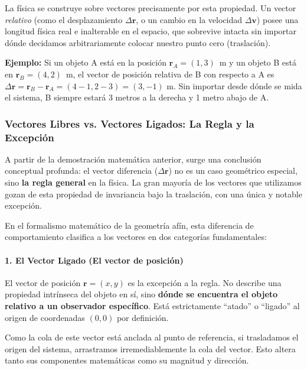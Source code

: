 \documentclass[11pt,a4paper]{book}
\begin{document}
La física se construye sobre vectores precisamente por esta propiedad. Un vector \textit{relativo} (como el desplazamiento $\Delta\boldsymbol{r}$, o un cambio en la velocidad $\Delta\boldsymbol{v}$) posee una longitud física real e inalterable en el espacio, que sobrevive intacta sin importar dónde decidamos arbitrariamente colocar nuestro punto cero (traslación).








\textbf{Ejemplo:} Si un objeto A está en la posición $\boldsymbol{r}_A = (1, 3)$~m y un objeto B está en $\boldsymbol{r}_B = (4, 2)$~m, el vector de posición relativa de B con respecto a A es $\Delta\boldsymbol{r} = \boldsymbol{r}_B - \boldsymbol{r}_A = (4-1, 2-3) = (3, -1)$ m. Sin importar desde dónde se mida el sistema, B siempre estará 3 metros a la derecha y 1 metro abajo de A.

\subsubsection{Vectores Libres vs. Vectores Ligados: La Regla y la Excepción}

A partir de la demostración matemática anterior, surge una conclusión conceptual profunda: el vector diferencia ($\Delta\boldsymbol{r}$) no es un caso geométrico especial, sino \textbf{la regla general} en la física. La gran mayoría de los vectores que utilizamos gozan de esta propiedad de invariancia bajo la traslación, con una única y notable excepción. 

En el formalismo matemático de la geometría afín, esta diferencia de comportamiento clasifica a los vectores en dos categorías fundamentales:

\paragraph{1. El Vector Ligado (El vector de posición)}
El vector de posición $\boldsymbol{r} = (x, y)$ es la excepción a la regla. No describe una propiedad intrínseca del objeto en sí, sino \textbf{dónde se encuentra el objeto relativo a un observador específico}. Está estrictamente ``atado'' o ``ligado'' al origen de coordenadas $(0,0)$ por definición. 

Como la cola de este vector está anclada al punto de referencia, si trasladamos el origen del sistema, arrastramos irremediablemente la cola del vector. Esto altera tanto sus componentes matemáticas como su magnitud y dirección.
\end{document}

